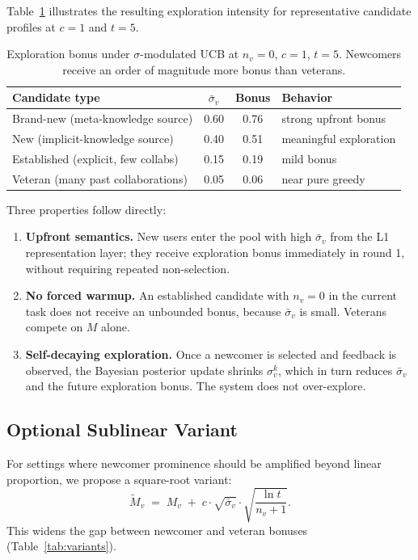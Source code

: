 \documentclass[11pt]{article}
\begin{document}
Table~\ref{tab:bonus-intuition} illustrates the resulting exploration intensity
for representative candidate profiles at $c = 1$ and $t = 5$.

\begin{table}[h]
\centering
\small
\begin{tabular}{lccl}
\toprule
Candidate type & $\bar{\sigma}_v$ & Bonus & Behavior \\
\midrule
Brand-new (meta-knowledge source)   & 0.60 & 0.76 & strong upfront bonus \\
New (implicit-knowledge source)     & 0.40 & 0.51 & meaningful exploration \\
Established (explicit, few collabs) & 0.15 & 0.19 & mild bonus \\
Veteran (many past collaborations)  & 0.05 & 0.06 & near pure greedy \\
\bottomrule
\end{tabular}
\caption{Exploration bonus under $\sigma$-modulated UCB at $n_v = 0$, $c = 1$,
$t = 5$. Newcomers receive an order of magnitude more bonus than veterans.}
\label{tab:bonus-intuition}
\end{table}

Three properties follow directly:

\begin{enumerate}
\item \textbf{Upfront semantics.} New users enter the pool with high
$\bar{\sigma}_v$ from the L1 representation layer; they receive exploration
bonus immediately in round 1, without requiring repeated non-selection.

\item \textbf{No forced warmup.} An established candidate with $n_v = 0$ in the
current task does not receive an unbounded bonus, because $\bar{\sigma}_v$ is
small. Veterans compete on $M$ alone.

\item \textbf{Self-decaying exploration.} Once a newcomer is selected and
feedback is observed, the Bayesian posterior update shrinks $\sigma_v^k$, which
in turn reduces $\bar{\sigma}_v$ and the future exploration bonus. The system
does not over-explore.
\end{enumerate}

\subsection{Optional Sublinear Variant}

For settings where newcomer prominence should be amplified beyond linear
proportion, we propose a square-root variant:
\begin{equation}
\widetilde{M}_v \;=\; M_v \;+\; c \cdot \sqrt{\bar{\sigma}_v} \cdot
\sqrt{\frac{\ln t}{n_v + 1}}.
\label{eq:sqrt-sigma-ucb}
\end{equation}
This widens the gap between newcomer and veteran bonuses (Table~\ref{tab:variants}).
\end{document}
